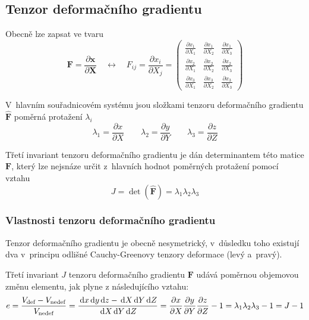 
\subsection{Tenzor deformačního gradientu}
Obecně lze zapsat ve tvaru
\begin{equation}
\bm{F} = \frac{\partial \bm{x}}{\partial \bm{X}}
\quad\leftrightarrow\quad
F_{ij} = \frac{\partial x_i}{\partial X_j} = \begin{pmatrix}
\frac{\partial x_1}{\partial X_1} & \frac{\partial x_1}{\partial X_2} & \frac{\partial x_1}{\partial X_3}\\
\frac{\partial x_2}{\partial X_1} & \frac{\partial x_2}{\partial X_2} & \frac{\partial x_2}{\partial X_3}\\
\frac{\partial x_3}{\partial X_1} & \frac{\partial x_3}{\partial X_2} & \frac{\partial x_3}{\partial X_3}
\end{pmatrix}
\end{equation}

V~hlavním souřadnicovém systému jsou složkami tenzoru deformačního gradientu $\hat{\bm{F}}$ poměrná protažení $\lambda_i$
\begin{equation}
\lambda_1  = \frac{\partial x}{\partial X}
\qquad
\lambda_2  = \frac{\partial y}{\partial Y}
\qquad
\lambda_3  = \frac{\partial z}{\partial Z}
\end{equation}

Třetí invariant tenzoru deformačního gradientu je dán determinantem této matice $\bm{F}$, který lze nejsnáze určit z~hlavních hodnot poměrných protažení pomocí vztahu
\begin{equation}
J = \det(\hat{\bm{F}}) = \lambda_1 \lambda_2 \lambda_3
\end{equation}

\subsubsection{Vlastnosti tenzoru deformačního gradientu}
Tenzor deformačního gradientu je obecně nesymetrický, v~důsledku toho existují dva v~principu odlišné Cauchy-Greenovy tenzory deformace (levý a~pravý).

Třetí invariant $J$ tenzoru deformačního gradientu $\bm{F}$ udává poměrnou objemovou změnu elementu, jak plyne z následujícího vztahu: 
\begin{equation}
	e
	= \frac{V_\text{def} - V_\text{nedef}}{V_\text{nedef}}
	= \frac{\,\mathrm{d} x \,\mathrm{d} y \,\mathrm{d} z - \,\mathrm{d} X \,\mathrm{d} Y \,\mathrm{d} Z}{\,\mathrm{d} X \,\mathrm{d} Y \,\mathrm{d} Z}
	= \frac{\partial x}{\partial X} \frac{\partial y}{\partial Y} \frac{\partial z}{\partial Z} - 1
	= \lambda_1 \lambda_2 \lambda_3 -1
	= J - 1
\end{equation}

